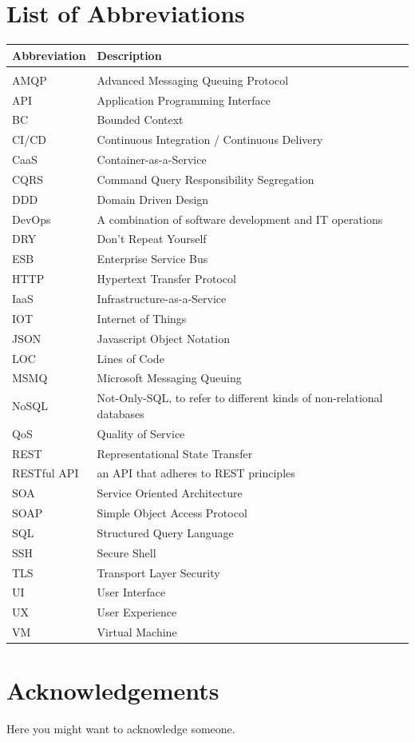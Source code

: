 \documentclass{Configuration_Files/PoliMi3i_thesis}
\begin{document}
\chapter*{List of Abbreviations}
\begin{table}[H]
    \centering
    \begin{tabular}{ll}
        \textbf{Abbreviation} & \textbf{Description} \\\hline\\[-9px]
        AMQP & Advanced Messaging Queuing Protocol \\[2px]
        API & Application Programming Interface \\[2px]
        BC & Bounded Context \\[2px]
        CI/CD & Continuous Integration / Continuous Delivery \\[2px]
        CaaS & Container-as-a-Service \\[2px]
        CQRS & Command Query Responsibility Segregation \\[2px]
        DDD & Domain Driven Design \\[2px]
        DevOps & A combination of software development and IT operations \\[2px]
        DRY & Don't Repeat Yourself \\[2px]
        ESB & Enterprise Service Bus \\[2px]
        HTTP & Hypertext Transfer Protocol \\[2px]
        IaaS & Infrastructure-as-a-Service \\[2px]
        IOT & Internet of Things \\[2px]
        JSON & Javascript Object Notation \\[2px]
        LOC & Lines of Code \\[2px]
        MSMQ & Microsoft Messaging Queuing \\[2px]
        NoSQL & Not-Only-SQL, to refer to different kinds of non-relational databases \\[2px]
        QoS & Quality of Service \\[2px]
        REST & Representational State Transfer \\[2px]
        RESTful API & an API that adheres to REST principles \\[2px]
        SOA & Service Oriented Architecture \\[2px]
        SOAP & Simple Object Access Protocol \\[2px]
        SQL & Structured Query Language \\[2px]
        SSH & Secure Shell \\[2px]
        TLS & Transport Layer Security \\[2px]
        UI & User Interface \\[2px]
        UX & User Experience \\[2px]
        VM & Virtual Machine \\[2px]
    \end{tabular}
\end{table}

\chapter*{Acknowledgements}
Here you might want to acknowledge someone.

\cleardoublepage
\end{document}

